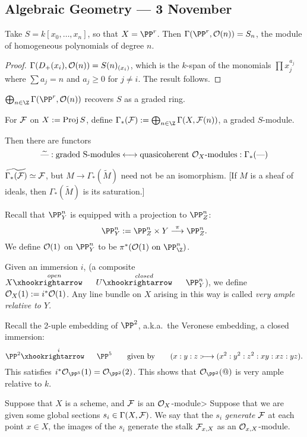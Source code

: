 \documentclass[11pt]{article}
\begin{document}
\begin{Nov3}
\section*{Algebraic Geometry --- 3 November}
\begin{claim}
Take $S=k[x_0,\ldots,x_n]$, so that $X=\PP^r$. Then $\Gamma(\PP^r,\calO(n))=S_n$, the module of homogeneous polynomials of degree $n$.
\begin{proof}
$\Gamma(D_+(x_i),\mathcal{O}(n))=S(n)_{(x_i)}$, which is the $k$-span of the monomials $\prod x_j^{a_j}$ where $\sum a_j=n$ and $a_j\geq0$ for $j\neq i$. The result follows.
\end{proof}
\end{claim}
\begin{cor*}
$\bigoplus_{n\in\Z}\Gamma(\PP^r,\calO(n))$ recovers $S$ as a graded ring.
\end{cor*}
\begin{defn*}
For $\mathcal{F}$ on $X:=\operatorname{Proj} S$, define $\Gamma_*(\calF):=\bigoplus_{n\in\Z}\Gamma(X,\calF(n))$, a graded $S$-module.
\end{defn*}
Then there are functors
\[\widetilde{\textup{---}}:\text{graded S-modules}\longleftrightarrow\text{quasicoherent $\mathcal{O}_X$-modules}:\Gamma_*(\textup{---})\]
\begin{prop*}
$\widetilde{\Gamma_*(\mathcal{F})}\simeq\mathcal{F}$, but $M\to \Gamma_*(\widetilde M)$ need not be an isomorphism. [If $M$ is a sheaf of ideals, then $\Gamma_*(\widetilde M)$ is its saturation.]
\end{prop*}
Recall that $\PP^n_Y$ is equipped with a projection to $\PP^n_Z$:
\[\PP^n_Y:=\PP^n_Z\times Y\overset{\pi}{\to}\PP^n_Z.\]
We define $\mathcal{O}(1)$ on $\PP^n_Y$ to be $\pi^*(\calO(1)\text{ on $\PP^n_\Z$})$.
\begin{defn*}
Given an immersion $i$, (a composite $X\overset{open}{\cofibration} U\overset{closed}{\cofibration} \PP^n_Y$), we define $\mathcal{O}_{X}(1):=i^*\mathcal{O}(1)$. Any line bundle on $X$ arising in this way is called \textit{very ample relative to $Y$}.
\end{defn*}
\begin{exmp*}
Recall the 2-uple embedding of $\PP^2$, a.k.a.\ the Veronese embedding, a closed immersion:
\[\PP^2\overset{i}{\cofibration} \PP^5\text{\qquad given by\qquad}(x:y:z:\mapsto(x^2:y^2:z^2:xy:xz:yz).\]
This satisfies $i^*\calO_{\PP^5}(1)=\calO_{\PP^2}(2)$. This shows that $\calO_{\PP^2}(@)$ is very ample relative to $k$.
\end{exmp*}
\begin{defn*}
Suppose that $X$ is a scheme, and $\mathcal{F}$ is an $\mathcal{O}_X$-module> Suppose that we are given some global sections $s_i\in\Gamma(X,\mathcal{F})$. We say that the $s_i$ \emph{generate} $\mathcal{F}$ \Iff at each point $x\in X$, the images of the $s_i$ generate the stalk $\mathcal{F}_{x,X}$ as an $\mathcal{O}_{x,X}$-module.


\end{defn*}
\end{Nov3}
\end{document}
